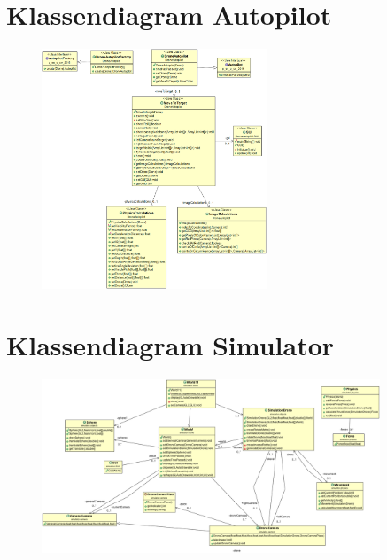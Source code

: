 \documentclass[tt]{penoverslag}
\begin{document}




\newpage\makeappendix

\section{Klassendiagram Autopilot} \label{App:KlassendiagramAutopilot}

\begin{figure}[h]
	\begin{center}
		\includegraphics[width=0.6\textwidth]{KlassendiagramAutopilot.png}
	\end{center}
\end{figure}

\section{Klassendiagram Simulator} \label{App:KlassendiagramSimulator}

\begin{figure}[h]
	\begin{center}
		\includegraphics[width=0.9\textwidth]{KlassendiagramSimulator.png}
	\end{center}
\end{figure}

%
\end{document}
